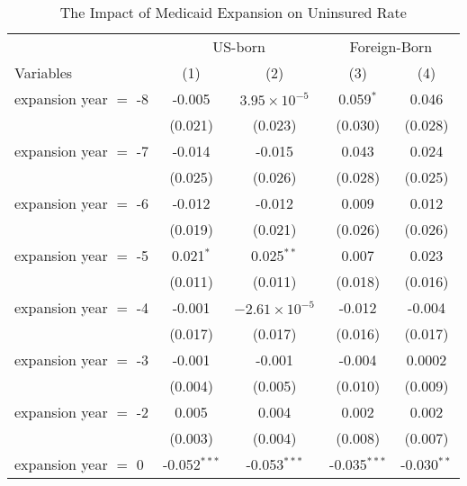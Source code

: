 \documentclass[
]{article}
\begin{document}
\begin{table}[htbp]
   \caption{The Impact of Medicaid Expansion on Uninsured Rate }
   \centering
   \small
   \begin{tabular}{lcccc}
      \tabularnewline \midrule \midrule
       & \multicolumn{2}{c}{US-born} & \multicolumn{2}{c}{Foreign-Born} \\ \cmidrule(lr){2-3} \cmidrule(lr){4-5}
      Variables             & (1)            & (2)                    & (3)            & (4)\\  
      \midrule 
      expansion year $=$ -8 & -0.005         & $3.95\times 10^{-5}$   & 0.059$^{*}$    & 0.046\\   
                            & (0.021)        & (0.023)                & (0.030)        & (0.028)\\   
      expansion year $=$ -7 & -0.014         & -0.015                 & 0.043          & 0.024\\   
                            & (0.025)        & (0.026)                & (0.028)        & (0.025)\\   
      expansion year $=$ -6 & -0.012         & -0.012                 & 0.009          & 0.012\\   
                            & (0.019)        & (0.021)                & (0.026)        & (0.026)\\   
      expansion year $=$ -5 & 0.021$^{*}$    & 0.025$^{**}$           & 0.007          & 0.023\\   
                            & (0.011)        & (0.011)                & (0.018)        & (0.016)\\   
      expansion year $=$ -4 & -0.001         & $-2.61\times 10^{-5}$  & -0.012         & -0.004\\   
                            & (0.017)        & (0.017)                & (0.016)        & (0.017)\\   
      expansion year $=$ -3 & -0.001         & -0.001                 & -0.004         & 0.0002\\   
                            & (0.004)        & (0.005)                & (0.010)        & (0.009)\\   
      expansion year $=$ -2 & 0.005          & 0.004                  & 0.002          & 0.002\\   
                            & (0.003)        & (0.004)                & (0.008)        & (0.007)\\   
      expansion year $=$ 0  & -0.052$^{***}$ & -0.053$^{***}$         & -0.035$^{***}$ & -0.030$^{**}$\\   

\end{tabular}
\end{table}
\end{document}
